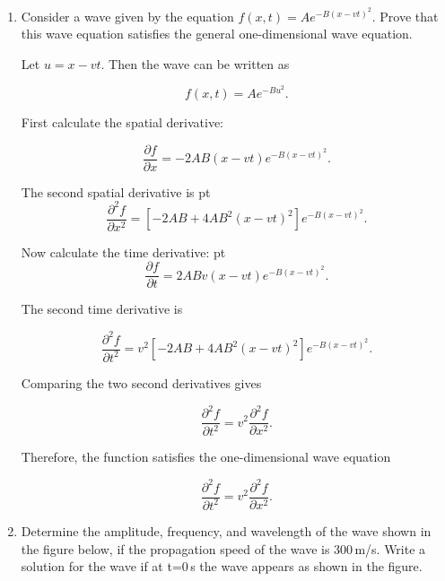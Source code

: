 \documentclass[t,aspectratio=169]{beamer}
\begin{document}
\begin{frame}
\begin{enumerate}
\begin{enumerate}
\end{enumerate}


\pagebreak
\item Consider a wave given by the equation $f(x,t) = A e^{-B(x-vt)^2}.$ Prove that this wave equation satisfies the general one-dimensional wave equation.

\bigskip
  
\begin{center}
\end{center}

Let $u=x-vt.$ Then the wave can be written as

$$f(x,t)=Ae^{-Bu^2}.$$

First calculate the spatial derivative:

$$\frac{\partial f}{\partial x}=-2AB(x-vt)e^{-B(x-vt)^2}.$$

The second spatial derivative is
 pt
$$\frac{\partial^{2}f}{\partial x^2}=\left[-2AB+4AB^2(x-vt)^2\right]e^{-B(x-vt)^2}.$$

Now calculate the time derivative:
 pt
$$\frac{\partial f}{\partial t}=2ABv(x-vt)e^{-B(x-vt)^2}.$$

\pagebreak
The second time derivative is

$$\frac{\partial^{2}f}{\partial t^{2}}=v^2\left[-2AB+4AB^2(x-vt)^2\right]e^{-B(x-vt)^2}.$$

Comparing the two second derivatives gives

$$\frac{\partial^{2}f}{\partial t^{2}}=v^2\frac{\partial^{2}f}{\partial x^{2}}.$$

Therefore, the function satisfies the one-dimensional wave equation

$$\boxed{\frac{\partial^{2}f}{\partial t^{2}}=v^2\frac{\partial^{2}f}{\partial x^{2}}}.$$


\pagebreak
\item Determine the amplitude, frequency, and wavelength of the wave shown in the figure below, if the propagation speed of the wave is 300\,m/s. Write a solution for the wave if at t=0\,s the wave appears as shown in the figure.


\end{enumerate}
\end{frame}
\end{document}
